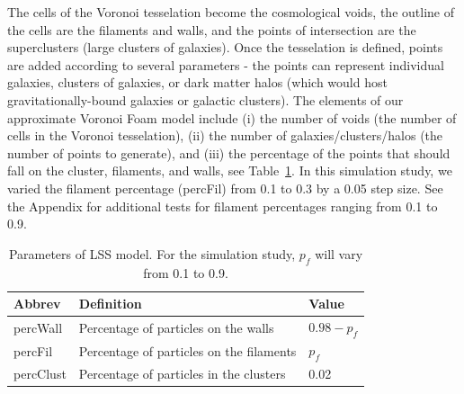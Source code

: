 \documentclass[12pt]{article}
\begin{document}
The cells of the Voronoi tesselation become the cosmological voids, the outline of the cells are the filaments and walls, and the points of intersection are the superclusters (large clusters of galaxies).  Once the tesselation is defined, points are added according to several parameters - the points can represent individual galaxies, clusters of galaxies, or dark matter halos (which would host gravitationally-bound galaxies or galactic clusters).
The elements of our approximate Voronoi Foam model include (i) the number of voids (the number of cells in the Voronoi tesselation), (ii) the number of galaxies/clusters/halos (the number of points to generate), and (iii) the percentage of the points that should fall on the cluster, filaments, and walls, see Table~\ref{table:voronoisettings}. In this simulation study, we varied the filament percentage (percFil) from 0.1 to 0.3 by a 0.05 step size. See the Appendix for additional tests for filament percentages ranging from 0.1 to 0.9.

\begin{table}[htp!]
\begin{center}
\begin{tabular}{ l|l|l }
Abbrev & Definition & Value \\
\hline
percWall & Percentage of particles on the walls & $0.98 - p_{f}$ \\
percFil & Percentage of particles on the filaments & $p_{f}$ \\
percClust & Percentage of particles in the clusters & 0.02 \\
\end{tabular}
\end{center}
\caption{Parameters of LSS model. For the simulation study, $p_{f}$ will vary from 0.1 to 0.9.}
\label{table:voronoisettings}
\end{table}
\end{document}
